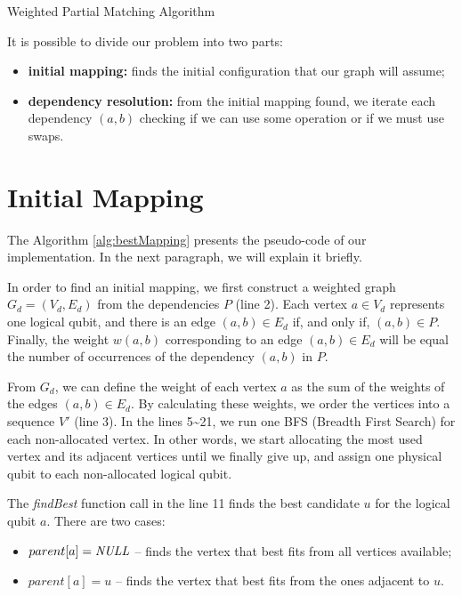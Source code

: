 \documentclass[paper=a4, fontsize=12pt]{scrartcl}
\begin{document}
	\begin{center}
		\Large Weighted Partial Matching Algorithm
	\end{center}

	It is possible to divide our problem into two parts:
	
	\begin{itemize}
		\item \textbf{initial mapping:} finds the initial configuration that our graph will assume;
		
		\item \textbf{dependency resolution:} from the initial mapping found, we iterate each dependency $(a, b)$ checking if we can use some operation or if we must use swaps.
	\end{itemize}

	\section{Initial Mapping}
	
	The Algorithm \ref{alg:bestMapping} presents the pseudo-code of our implementation. In the next paragraph, we will explain it briefly. 
	
	In order to find an initial mapping, we first construct a weighted graph $G_d = (V_d, E_d)$ from the dependencies $P$ (line 2). Each vertex $a \in V_d$ represents one logical qubit, and there is an edge $(a, b) \in E_d$ if, and only if, $(a, b) \in P$. Finally, the weight $w(a, b)$ corresponding to an edge $(a, b) \in E_d$ will be equal the number of occurrences of the dependency $(a, b)$ in $P$.
	
	From $G_d$, we can define the weight of each vertex $a$ as the sum of the weights of the edges $(a, b) \in E_d$. By calculating these weights, we order the vertices into a sequence $V'$ (line 3). In the lines 5\textasciitilde21, we run one BFS (Breadth First Search) for each non-allocated vertex. In other words, we start allocating the most used vertex and its adjacent vertices until we finally give up, and assign one physical qubit to each non-allocated logical qubit.
	
	The \textit{findBest} function call in the line 11 finds the best candidate $u$ for the logical qubit $a$. There are two cases:
	
	\begin{itemize}
		\item $parent[a] = \textrm{\textit{NULL}}$ -- finds the vertex that best fits from all vertices available;
		
		\item $parent[a] = u$ -- finds the vertex that best fits from the ones adjacent to $u$.
	\end{itemize}
\end{document}
